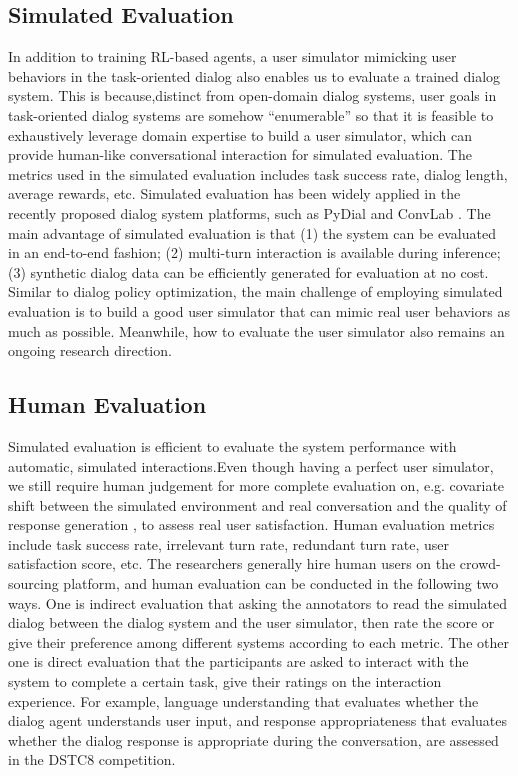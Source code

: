 \documentclass[10pt,twocolumn,letterpaper]{article}
\begin{document}
\subsection{Simulated Evaluation}
In addition to training RL-based agents, a user simulator mimicking user behaviors in the task-oriented dialog also enables us to evaluate a trained dialog system. This is because,distinct from open-domain dialog systems, user goals in task-oriented dialog systems are somehow “enumerable” so that it is feasible to exhaustively leverage domain expertise to build a user simulator, which can provide human-like conversational interaction for simulated evaluation. The metrics used in the simulated evaluation includes task success rate, dialog length, average rewards, etc. Simulated evaluation has been widely applied in the recently proposed dialog system platforms, such as PyDial \cite{ultes2017pydial} and ConvLab \cite{lee2019convlab,zhu2020convlab}. The main advantage of simulated evaluation is that (1) the system can be evaluated in an end-to-end fashion; (2) multi-turn interaction is available during inference; (3) synthetic dialog data can be efficiently generated for evaluation at no cost. Similar to dialog policy optimization, the main challenge of employing simulated evaluation is to build a good user simulator that can mimic real user behaviors as much as possible. Meanwhile, how to evaluate the user simulator also remains an ongoing research direction\cite{pietquin2013survey}.
\subsection{Human Evaluation}
Simulated evaluation is efficient to evaluate the system performance with automatic, simulated interactions.Even though having a perfect user simulator, we still require human judgement for more complete evaluation on, e.g. covariate shift between the simulated environment and real conversation \cite{liu2018adversarial} and the quality of response generation \cite{wen2016network}, to assess real user satisfaction. Human evaluation metrics include task success rate, irrelevant turn rate, redundant turn rate, user satisfaction score, etc. The researchers generally hire human users on the crowd-sourcing platform, and human evaluation can be conducted in the following two ways. One is indirect evaluation that asking the annotators to read the simulated dialog between the dialog system and the user simulator, then rate the score \cite{shi2019build } or give their preference among different systems \cite{takanobu2019guided} according to each metric. The other one is direct evaluation that the participants are asked to interact with the system to complete a certain task, give their ratings on the interaction experience. For example, language understanding that evaluates whether the dialog agent understands user input, and response appropriateness that evaluates whether the dialog response is appropriate during the conversation, are assessed in the DSTC8 competition\cite{li2020results}.
\end{document}
